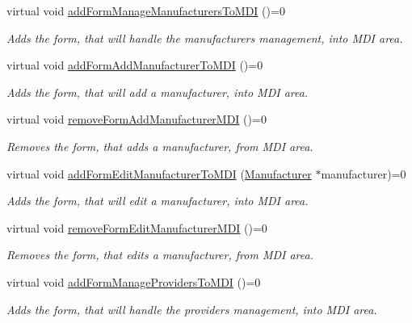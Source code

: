 \begin{DoxyCompactItemize}
virtual void \hyperlink{class_i_main_window_a25b49e7a985f4d0e055b9f688beb515c}{add\-Form\-Manage\-Manufacturers\-To\-M\-D\-I} ()=0
\begin{DoxyCompactList}\small\item\em \-Adds the form, that will handle the manufacturers management, into \-M\-D\-I area. \end{DoxyCompactList}\item 
virtual void \hyperlink{class_i_main_window_ad8a7353d47d6aa02e9af2df0f60d7fbc}{add\-Form\-Add\-Manufacturer\-To\-M\-D\-I} ()=0
\begin{DoxyCompactList}\small\item\em \-Adds the form, that will add a manufacturer, into \-M\-D\-I area. \end{DoxyCompactList}\item 
virtual void \hyperlink{class_i_main_window_a081759066758a7548d6325d7f7b0af4f}{remove\-Form\-Add\-Manufacturer\-M\-D\-I} ()=0
\begin{DoxyCompactList}\small\item\em \-Removes the form, that adds a manufacturer, from \-M\-D\-I area. \end{DoxyCompactList}\item 
virtual void \hyperlink{class_i_main_window_aba30e79e3188e953b5499014fe29b680}{add\-Form\-Edit\-Manufacturer\-To\-M\-D\-I} (\hyperlink{class_manufacturer}{\-Manufacturer} $\ast$manufacturer)=0
\begin{DoxyCompactList}\small\item\em \-Adds the form, that will edit a manufacturer, into \-M\-D\-I area. \end{DoxyCompactList}\item 
virtual void \hyperlink{class_i_main_window_aeb76e51e5e11051cf64d7677242f525a}{remove\-Form\-Edit\-Manufacturer\-M\-D\-I} ()=0
\begin{DoxyCompactList}\small\item\em \-Removes the form, that edits a manufacturer, from \-M\-D\-I area. \end{DoxyCompactList}\item 
virtual void \hyperlink{class_i_main_window_a3258c12b32eb8f3d04df21d1b27565cb}{add\-Form\-Manage\-Providers\-To\-M\-D\-I} ()=0
\begin{DoxyCompactList}\small\item\em \-Adds the form, that will handle the providers management, into \-M\-D\-I area. \end{DoxyCompactList}\item 

\end{DoxyCompactItemize}
